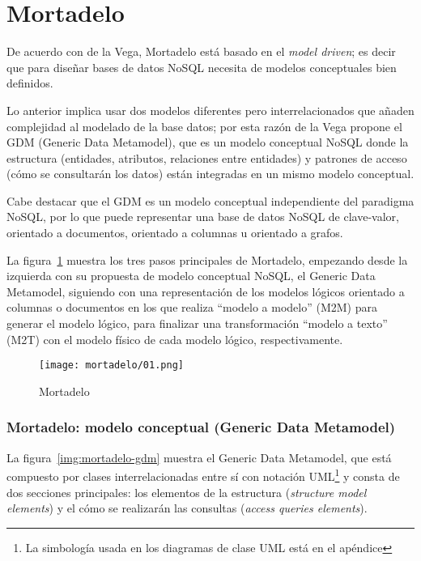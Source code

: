 \section{Mortadelo}
De acuerdo con de la Vega\cite{de_la_vega_mortadelo_2020}, Mortadelo está basado en el \textit{model driven}; es decir que para diseñar bases de datos NoSQL necesita de modelos conceptuales bien definidos.


Lo anterior implica usar dos modelos diferentes pero interrelacionados que añaden complejidad al modelado de la base datos; por esta razón de la Vega propone el GDM (Generic Data Metamodel), que es un modelo conceptual NoSQL donde la estructura (entidades, atributos, relaciones entre entidades) y patrones de acceso (cómo se consultarán los datos) están integradas en un mismo modelo conceptual.


Cabe destacar que el GDM es un modelo conceptual independiente del paradigma NoSQL, por lo que puede representar una base de datos NoSQL de clave-valor, orientado a documentos, orientado a columnas u orientado a grafos.


La figura~\ref{img:mortadelo-process} muestra los tres pasos principales de Mortadelo, empezando desde la izquierda con su propuesta de modelo conceptual NoSQL, el Generic Data Metamodel, siguiendo con una representación de los modelos lógicos orientado a columnas o documentos en los que realiza ``modelo a modelo'' (M2M) para generar el modelo lógico, para finalizar una transformación ``modelo a texto'' (M2T) con el modelo físico de cada modelo lógico, respectivamente.


\begin{figure}[H] 
    \centering
    \texttt{[image: mortadelo/01.png]}
    \caption{Mortadelo}
    \label{img:mortadelo-process}
\end{figure}

\subsubsection*{Mortadelo: modelo conceptual (Generic Data Metamodel)}

La figura~\ref{img:mortadelo-gdm} muestra el Generic Data Metamodel, que está compuesto por clases interrelacionadas entre sí con notación UML\footnote{La simbología usada en los diagramas de clase UML está en el apéndice} y consta de dos secciones principales: los elementos de la estructura (\textit{structure model elements}) y el cómo se realizarán las consultas (\textit{access queries elements}).


